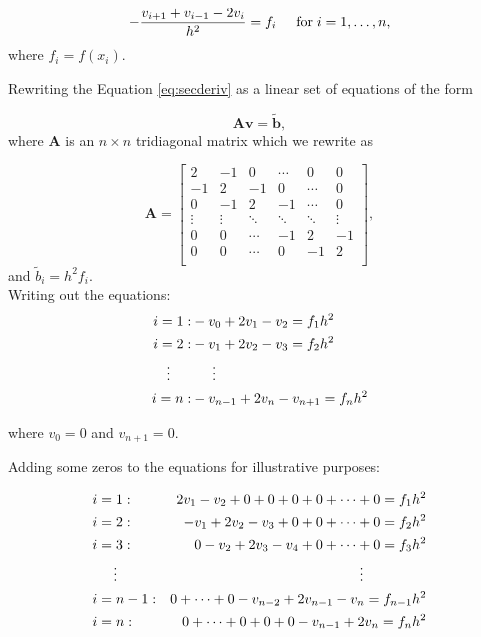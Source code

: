 \begin{equation}\label{eq:secderiv}
   -\frac{v_{i+1}+v_{i-1}-2v_i}{h^2} = f_i  \hspace{0.5cm} \mathrm{for} \hspace{0.1cm} i=1,\dots, n,
\end{equation}
where $f_i=f(x_i)$.

Rewriting the Equation \ref{eq:secderiv} as a linear set of equations of the form

\begin{equation*}
   \mathbf{A}\mathbf{v} = \tilde{\mathbf{b}},
\end{equation*}
where $\mathbf{A}$ is an $n\times n$  tridiagonal matrix which we rewrite as

\[
    \mathbf{A} = \begin{bmatrix}
    	2& -1& 0 &\cdots & 0 &0 \\
        -1 & 2 & -1 &0 &\cdots &0 \\
        0&-1 &2 & -1 & \cdots & 0 \\
        \vdots& \vdots & \ddots &\ddots &\ddots & \vdots \\
        0&0 & \cdots &-1 &2& -1 \\
        0&0 & \cdots & 0  &-1 & 2 \\
        \end{bmatrix},
\]
and $\tilde{b}_i=h^2f_i$.\\

Writing out the equations:
\begin{align*}
i = 1: &-v_0+2v_1-v_2 = f_1 h^2\\
i = 2: &-v_1+2v_2-v_3 = f_2 h^2\\
\vdots \indent &\indent \vdots\\
i = n: &-v_{n-1}+2v_n-v_{n+1} = f_n h^2\\
\end{align*}

where $v_0 = 0$ and $v_{n+1} = 0$.

Adding some zeros to the equations for illustrative purposes:

\begin{align*}
&i = 1:  &2v_1-v_2 + 0 + 0 + 0 +0 + \cdots + 0 = f_1 h^2\\
&i = 2: &-v_1+2v_2-v_3 +0 + 0 + \cdots + 0 = f_2 h^2\\
&i = 3:  &0 -v_2+2v_3-v_4 + 0 + \cdots + 0 = f_3 h^2\\
&\indent\vdots \indent &\vdots \indent \indent \indent \\
&i = n-1: &0 + \cdots+ 0 -v_{n-2}+2v_{n-1} - v_n= f_{n-1} h^2\\
&i = n: &0 + \cdots + 0 + 0 + 0 -v_{n-1}+2v_n= f_n h^2\\
\end{align*}

